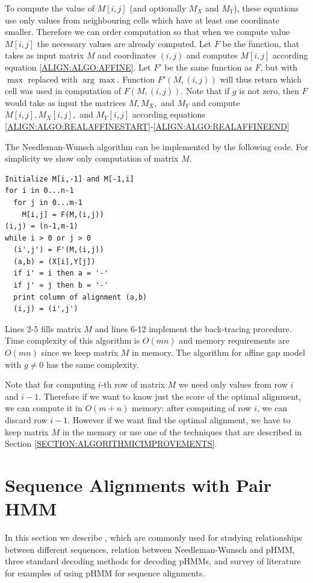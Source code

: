 To compute the
value of $M[i,j]$ (and optionally $M_X$ and $M_Y$), these equations use only values
from neighbouring cells which have at least one coordinate smaller. 
Therefore we can order computation so that when we compute value $M[i,j]$ the
necessary values are already computed.
Let $F$ be
the function, that takes as input matrix $M$  and coordinates $(i,j)$ and computes $M[i,j]$ according equation
\ref{ALIGN:ALGO:AFFINE}.  Let $F'$ be the
same function as $F$, but with $\max$ replaced with $\arg\max$.  Function
$F'(M,(i,j))$ will thus return which cell was used in computation of $F(M,(i,j))$.
Note that if $g$ is not zero, then $F$ would take as input the matrices $M,M_X,$
and $M_Y$ and compute $M[i,j],M_X[i,j],$ and $M_Y[i,j]$ according 
 equations
\ref{ALIGN:ALGO:REALAFFINESTART}-\ref{ALIGN:ALGO:REALAFFINEEND}

The Needleman-Wunsch algorithm can be implemented by the following code. For simplicity 
we show only computation of matrix $M$.

\lstset{showstringspaces=false}
\begin{lstlisting}
Initialize M[i,-1] and M[-1,i]
for i in 0...n-1
  for j in 0...m-1
    M[i,j] = F(M,(i,j))
(i,j) = (n-1,m-1)
while i > 0 or j > 0
  (i',j') = F'(M,(i,j))
  (a,b) = (X[i],Y[j])
  if i' = i then a = '-'
  if j' = j then b = '-'
  print column of alignment (a,b)
  (i,j) = (i',j')
\end{lstlisting}

Lines 2-5 fills matrix $M$ and lines 6-12 implement the back-tracing procedure.
Time complexity of this algorithm is $O(mn)$ and memory requirements are $O(mn)$
since we keep matrix $M$ in memory. The algorithm for
affine gap model with $g\not=0$ has the same complexity.


Note that for computing  $i$-th row of matrix $M$ we need only values from row
$i$ and $i-1$. Therefore if we want to know just the score of the optimal
alignment,
we can compute it in $O(m+n)$ memory: after computing of row $i$, we can discard
row $i-1$. However if we want find the optimal alignment, we have to keep matrix
$M$ in the memory or use one of the techniques that are described in Section 
\ref{SECTION:ALGORITHMICIMPROVEMENTS}.

\section{Sequence Alignments with Pair HMM}\label{SECTION:ALIGNWITHPHMM}

In this section we describe ,
which are commonly used for studying relationships between different sequences,
relation between Needleman-Wunsch and pHMM, three standard decoding methods for
decoding pHMMs, and survey of literature for examples of using pHMM for
sequence alignments. 

